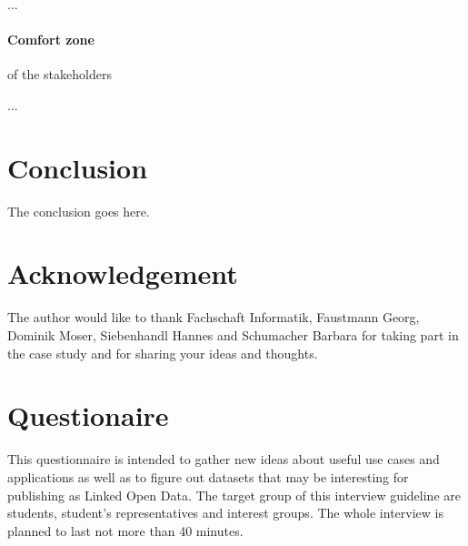 \documentclass{article}
\begin{document}
...

\paragraph{Comfort zone} of the stakeholders
\label{technical-architecture-challenges:challenges:comfort-zone}

...


\section{Conclusion}
\label{conclusion}
The conclusion goes here.

 
\section{Acknowledgement}
\label{acknowledgement}
The author would like to thank Fachschaft Informatik, Faustmann Georg, Dominik Moser, Siebenhandl Hannes and Schumacher Barbara for taking part in the case study and for sharing your ideas and thoughts.

\newpage
\appendix


\section{Questionaire}
\label{questionaire}
This questionnaire is intended to gather new ideas about useful use cases and applications as well as to figure out datasets that may be interesting for publishing as Linked Open Data. The target group of this interview guideline are students, student’s representatives and interest groups. The whole interview is planned to last not more than 40 minutes.
\end{document}
